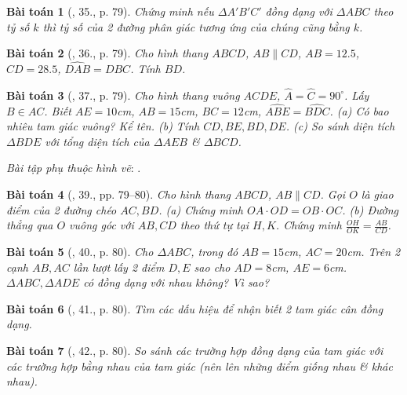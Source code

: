\documentclass{article}
\newtheorem{baitoan}{Bài toán}
\begin{document}
\begin{baitoan}[\cite{SGK_Toan_8_tap_2}, 35., p. 79]
	Chứng minh nếu $\Delta A'B'C'$ đồng dạng với $\Delta ABC$ theo tỷ số $k$ thì tỷ số của 2 đường phân giác tương ứng của chúng cũng bằng $k$.
\end{baitoan}

\begin{baitoan}[\cite{SGK_Toan_8_tap_2}, 36., p. 79]
	Cho hình thang $ABCD$, $AB\parallel CD$, $AB = 12.5$, $CD = 28.5$, $\widehat{DAB} = \widehat{DBC}$. Tính $BD$.
\end{baitoan}

\begin{baitoan}[\cite{SGK_Toan_8_tap_2}, 37., p. 79]
	Cho hình thang vuông $ACDE$, $\widehat{A} = \widehat{C} = 90^\circ$. Lấy $B\in AC$. Biết $AE = 10$\emph{cm}, $AB = 15$\emph{cm}, $BC = 12$\emph{cm}, $\widehat{ABE} = \widehat{BDC}$. (a) Có bao nhiêu tam giác vuông? Kể tên. (b) Tính $CD,BE,BD,DE$. (c) So sánh diện tích $\Delta BDE$ với tổng diện tích của $\Delta AEB$ \& $\Delta BCD$.
\end{baitoan}
\noindent\textit{Bài tập phụ thuộc hình vẽ}: \cite[38., p. 79]{SGK_Toan_8_tap_2}.

\begin{baitoan}[\cite{SGK_Toan_8_tap_2}, 39., pp. 79--80]
	Cho hình thang $ABCD$, $AB\parallel CD$. Gọi $O$ là giao điểm của 2 đường chéo $AC,BD$. (a) Chứng minh $OA\cdot OD = OB\cdot OC$. (b) Đường thẳng qua $O$ vuông góc với $AB,CD$ theo thứ tự tại $H,K$. Chứng minh $\frac{OH}{OK} = \frac{AB}{CD}$.
\end{baitoan}

\begin{baitoan}[\cite{SGK_Toan_8_tap_2}, 40., p. 80]
	Cho $\Delta ABC$, trong đó $AB = 15$\emph{cm}, $AC = 20$\emph{cm}. Trên 2 cạnh $AB,AC$ lần lượt lấy 2 điểm $D,E$ sao cho $AD = 8$\emph{cm}, $AE = 6$\emph{cm}. $\Delta ABC,\Delta ADE$ có đồng dạng với nhau không? Vì sao?	
\end{baitoan}

\begin{baitoan}[\cite{SGK_Toan_8_tap_2}, 41., p. 80]
	Tìm các dấu hiệu để nhận biết 2 tam giác cân đồng dạng.
\end{baitoan}

\begin{baitoan}[\cite{SGK_Toan_8_tap_2}, 42., p. 80]
	So sánh các trường hợp đồng dạng của tam giác với các trường hợp bằng nhau của tam giác (nên lên những điểm giống nhau \& khác nhau).
\end{baitoan}
\end{document}

